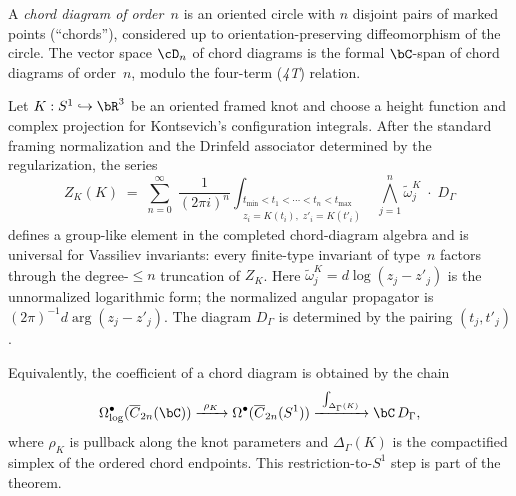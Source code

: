 \begin{definition}
\label{def:chord-diagram}
A \emph{chord diagram of order~$n$} is an oriented circle with
$n$ disjoint pairs of marked points (``chords''), considered up to
orientation-preserving diffeomorphism of the circle. The vector
space $\cD_n$ of chord diagrams is the formal $\bC$-span of
chord diagrams of order~$n$, modulo the four-term
(\emph{4T}) relation.
\end{definition}

\begin{theorem}
\label{thm:kontsevich-invariant}
Let $K:S^1\hookrightarrow \bR^3$ be an oriented framed knot and choose
a height function and complex projection for Kontsevich's
configuration integrals.  After the standard framing normalization
and the Drinfeld associator determined by the regularization, the series
\[
Z_K(K) \;=\;
\sum_{n=0}^\infty \;
\frac{1}{(2\pi i)^n}
\int_{\substack{t_{\min} < t_1 < \cdots < t_n < t_{\max} \\
 z_i = K(t_i),\; z'_i = K(t'_i)}}
\bigwedge_{j=1}^n
\widetilde\omega^K_{j}
\;\cdot\; D_\Gamma
\]
defines a group-like element in the completed chord-diagram algebra
and is universal for Vassiliev invariants: every finite-type invariant
of type~$n$ factors through the degree-$\leq n$ truncation of $Z_K$.
Here $\widetilde\omega^K_{j}=d\log(z_j-z'_j)$ is the unnormalized
logarithmic form; the normalized angular propagator is
$(2\pi)^{-1}d\arg(z_j-z'_j)$.  The diagram $D_\Gamma$ is determined
by the pairing $(t_j,t'_j)$.

Equivalently, the coefficient of a chord diagram is obtained by the
chain
\[
\Omega^\bullet_{\log}(\overline{C}_{2n}(\bC))
\xrightarrow{\ \rho_K\ }
\Omega^\bullet(\overline{C}_{2n}(S^1))
\xrightarrow{\ \int_{\Delta_\Gamma(K)}\ }
\bC\,D_\Gamma ,
\]
where $\rho_K$ is pullback along the knot parameters and
$\Delta_\Gamma(K)$ is the compactified simplex of the ordered chord
endpoints.  This restriction-to-$S^1$ step is part of the theorem.
\end{theorem}

